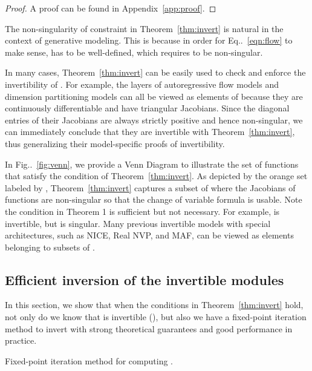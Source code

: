 \documentclass{article}
\makeatletter
\def\@onedot{\ifx\@let@token.\else.\null\fi\xspace}
\DeclareRobustCommand\onedot{\futurelet\@let@token\@onedot}
\newcommand{\eqnref}[1]{Eq\onedot~\eqref{#1}}
\newcommand{\figref}[1]{Fig\onedot~\ref{#1}}
\newcommand{\thmref}[1]{Theorem~\ref{#1}}
\makeatother
\begin{document}
\begin{proof}
A proof can be found in Appendix~\ref{app:proof}.
\end{proof}

The non-singularity of  constraint in \thmref{thm:invert} is natural in the context of generative modeling. This is because in order for \eqnref{eqn:flow} to make sense,  has to be well-defined, which requires  to be non-singular.

In many cases, \thmref{thm:invert} can be easily used to check and enforce the invertibility of . For example, the layers of autoregressive flow models and dimension partitioning models can all be viewed as elements of  because they are continuously differentiable and have triangular Jacobians. Since the diagonal entries of their Jacobians are always strictly positive and hence non-singular, we can immediately conclude that they are invertible with \thmref{thm:invert}, thus generalizing their model-specific proofs of invertibility. 

In \figref{fig:venn}, we provide a Venn Diagram to illustrate the set of functions that satisfy the condition of \thmref{thm:invert}. As depicted by the orange set labeled by , \thmref{thm:invert} captures a subset of  where the Jacobians of functions are non-singular so that the change of variable formula is usable. Note the condition in Theorem 1 is sufficient but not necessary.
For example,  is invertible, but  is singular. Many previous invertible models with special architectures, such as NICE, Real NVP, and MAF, can be viewed as elements belonging to subsets of . 








\subsection{Efficient inversion of the invertible modules}
In this section, we show that when the conditions in \thmref{thm:invert} hold, not only do we know that  is invertible (), but also we have a fixed-point iteration method to invert  with strong theoretical guarantees and good performance in practice.

\begin{algorithm}
	\caption{Fixed-point iteration method for computing .}
	\label{alg:solver}
	\begin{algorithmic}[1]
	    \Require{} 
            \State{}
        \EndFor
        \item[]
        \Return{}
	\end{algorithmic}
\end{algorithm}
\end{document}
